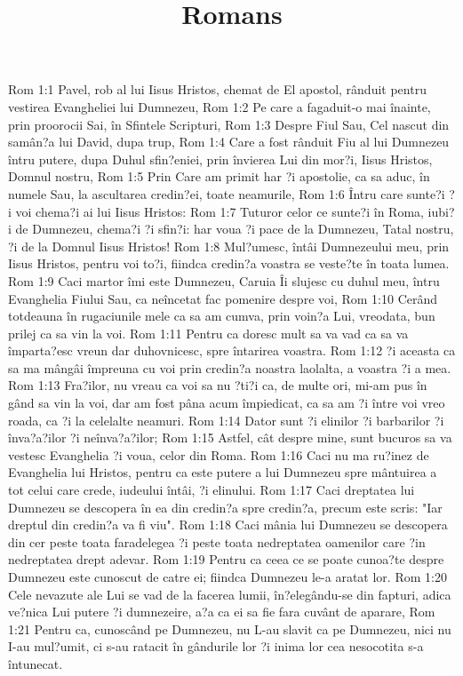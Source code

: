 

\title{Romans}

Rom 1:1  Pavel, rob al lui Iisus Hristos, chemat de El apostol, rânduit pentru vestirea Evangheliei lui Dumnezeu,
Rom 1:2  Pe care a fagaduit-o mai înainte, prin proorocii Sai, în Sfintele Scripturi,
Rom 1:3  Despre Fiul Sau, Cel nascut din samân?a lui David, dupa trup,
Rom 1:4  Care a fost rânduit Fiu al lui Dumnezeu întru putere, dupa Duhul sfin?eniei, prin învierea Lui din mor?i, Iisus Hristos, Domnul nostru,
Rom 1:5  Prin Care am primit har ?i apostolie, ca sa aduc, în numele Sau, la ascultarea credin?ei, toate neamurile,
Rom 1:6  Întru care sunte?i ?i voi chema?i ai lui Iisus Hristos:
Rom 1:7  Tuturor celor ce sunte?i în Roma, iubi?i de Dumnezeu, chema?i ?i sfin?i: har voua ?i pace de la Dumnezeu, Tatal nostru, ?i de la Domnul Iisus Hristos!
Rom 1:8  Mul?umesc, întâi Dumnezeului meu, prin Iisus Hristos, pentru voi to?i, fiindca credin?a voastra se veste?te în toata lumea.
Rom 1:9  Caci martor îmi este Dumnezeu, Caruia Îi slujesc cu duhul meu, întru Evanghelia Fiului Sau, ca neîncetat fac pomenire despre voi,
Rom 1:10  Cerând totdeauna în rugaciunile mele ca sa am cumva, prin voin?a Lui, vreodata, bun prilej ca sa vin la voi.
Rom 1:11  Pentru ca doresc mult sa va vad ca sa va împarta?esc vreun dar duhovnicesc, spre întarirea voastra.
Rom 1:12  ?i aceasta ca sa ma mângâi împreuna cu voi prin credin?a noastra laolalta, a voastra ?i a mea.
Rom 1:13  Fra?ilor, nu vreau ca voi sa nu ?ti?i ca, de multe ori, mi-am pus în gând sa vin la voi, dar am fost pâna acum împiedicat, ca sa am ?i între voi vreo roada, ca ?i la celelalte neamuri.
Rom 1:14  Dator sunt ?i elinilor ?i barbarilor ?i înva?a?ilor ?i neînva?a?ilor;
Rom 1:15  Astfel, cât despre mine, sunt bucuros sa va vestesc Evanghelia ?i voua, celor din Roma.
Rom 1:16  Caci nu ma ru?inez de Evanghelia lui Hristos, pentru ca este putere a lui Dumnezeu spre mântuirea a tot celui care crede, iudeului întâi, ?i elinului.
Rom 1:17  Caci dreptatea lui Dumnezeu se descopera în ea din credin?a spre credin?a, precum este scris: "Iar dreptul din credin?a va fi viu".
Rom 1:18  Caci mânia lui Dumnezeu se descopera din cer peste toata faradelegea ?i peste toata nedreptatea oamenilor care ?in nedreptatea drept adevar.
Rom 1:19  Pentru ca ceea ce se poate cunoa?te despre Dumnezeu este cunoscut de catre ei; fiindca Dumnezeu le-a aratat lor.
Rom 1:20  Cele nevazute ale Lui se vad de la facerea lumii, în?elegându-se din fapturi, adica ve?nica Lui putere ?i dumnezeire, a?a ca ei sa fie fara cuvânt de aparare,
Rom 1:21  Pentru ca, cunoscând pe Dumnezeu, nu L-au slavit ca pe Dumnezeu, nici nu I-au mul?umit, ci s-au ratacit în gândurile lor ?i inima lor cea nesocotita s-a întunecat.
